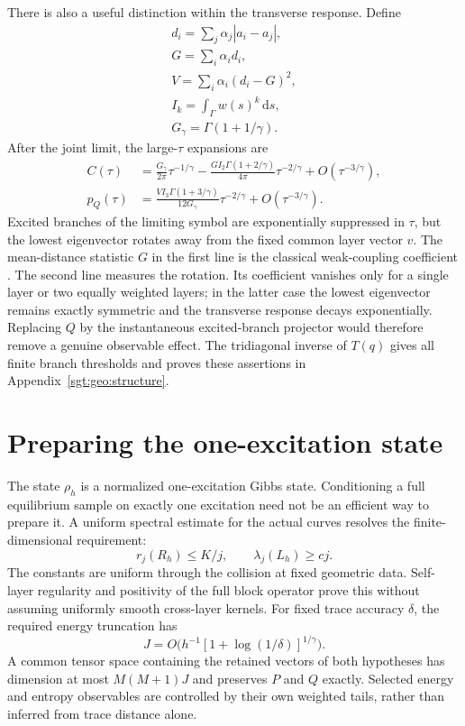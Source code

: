 \documentclass[aps,pra,reprint,superscriptaddress,longbibliography]{revtex4-2}
\newcommand{\dd}{\mathrm d}
\begin{document}
There is also a useful distinction within the transverse response.
Define
\begin{gather}
 d_i=\sum_j\alpha_j|a_i-a_j|,\\
 G=\sum_i\alpha_i d_i,\\
 V=\sum_i\alpha_i(d_i-G)^2,\nonumber\\
 I_k=\int_\Gamma w(s)^k\,\dd s,\\
 G_\gamma=\Gamma(1+1/\gamma).
 \label{sgt:main:profile}
\end{gather}
After the joint limit, the large-$\tau$ expansions are
\begin{align}
 C(\tau)&=\frac{G_\gamma}{2\pi}\tau^{-1/\gamma}
 -\frac{G I_2\Gamma(1+2/\gamma)}{4\pi}\tau^{-2/\gamma}
 +O(\tau^{-3/\gamma}),\nonumber\\
 p_Q(\tau)&=\frac{V I_3\Gamma(1+3/\gamma)}{12G_\gamma}
                   \tau^{-2/\gamma}+O(\tau^{-3/\gamma}).
 \label{sgt:main:rotation}
\end{align}
Excited branches of the limiting symbol are exponentially suppressed in
$\tau$, but the lowest eigenvector rotates away from the fixed common
layer vector $v$. The mean-distance statistic $G$ in the first line
is the classical weak-coupling coefficient \cite{Simon1976,Simon2022}.
The second line measures the rotation. Its coefficient
vanishes only for a single layer or two equally weighted layers; in the
latter case the lowest eigenvector remains exactly symmetric and the
transverse response decays exponentially. Replacing $Q$ by the
instantaneous excited-branch projector would therefore remove a genuine
observable effect. The tridiagonal inverse of $T(q)$ gives all finite
branch thresholds and proves these assertions in
Appendix~\ref{sgt:geo:structure}.

\section{Preparing the one-excitation state}
\label{sgt:main:preparation}

The state $\rho_h$ is a normalized one-excitation Gibbs state. Conditioning
a full equilibrium sample on exactly one excitation need not be an
efficient way to prepare it. A uniform spectral estimate for the actual
curves resolves the finite-dimensional requirement:
\begin{equation}
 r_j(R_h)\le K/j,\qquad \lambda_j(L_h)\ge cj.
 \label{sgt:main:weakS1}
\end{equation}
The constants are uniform through the collision at fixed geometric
data. Self-layer regularity and positivity of the full block operator
prove this without assuming uniformly smooth cross-layer kernels.
For fixed trace accuracy $\delta$, the required energy truncation has
\begin{equation}
 J=O\bigl(h^{-1}[1+\log(1/\delta)]^{1/\gamma}\bigr).
 \label{sgt:main:J}
\end{equation}
A common tensor space containing the retained vectors of both hypotheses
has dimension at most $M(M+1)J$ and preserves $P$ and $Q$ exactly.
Selected energy and entropy observables are controlled by their own
weighted tails, rather than inferred from trace distance alone.
\end{document}
